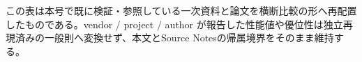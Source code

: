 \normalsize
\begin{claimboundary}[この比較の境界]
この表は本号で既に検証・参照している一次資料と論文を横断比較の形へ再配置したものである。vendor / project / author が報告した性能値や優位性は独立再現済みの一般則へ変換せず、本文とSource Notesの帰属境界をそのまま維持する。
\end{claimboundary}
